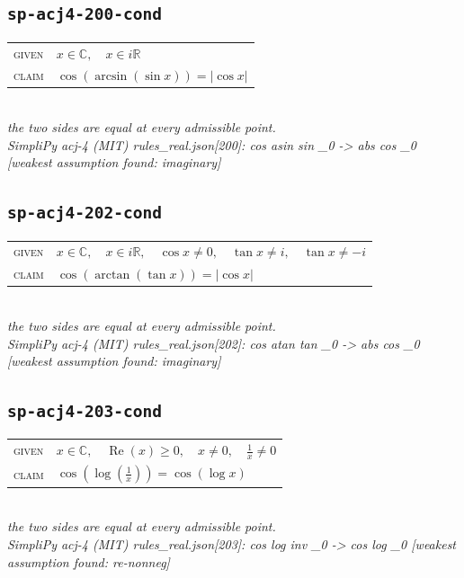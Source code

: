 \documentclass[11pt]{article}
\begin{document}
\subsection*{\texttt{sp-acj4-200-cond}}
\begin{tabular}{@{}l@{\quad}l@{}}
\textsc{given} & $x \in \mathbb{C},\quad x \in i\mathbb{R}$ \\[4pt]
\textsc{claim} & $\displaystyle \cos\left(\arcsin\left(\sin x\right)\right) = \left|\cos x\right|$ \\
\end{tabular}\\[2pt]
{\small\emph{the two sides are equal at every admissible point.}}\\
\emph{SimpliPy acj-4 (MIT) rules\_real.json[200]: cos asin sin \_0  ->  abs cos \_0  [weakest assumption found: imaginary]}\\

\subsection*{\texttt{sp-acj4-202-cond}}
\begin{tabular}{@{}l@{\quad}l@{}}
\textsc{given} & $x \in \mathbb{C},\quad x \in i\mathbb{R},\quad \cos x \neq 0,\quad \tan x \neq i,\quad \tan x \neq -i$ \\[4pt]
\textsc{claim} & $\displaystyle \cos\left(\arctan\left(\tan x\right)\right) = \left|\cos x\right|$ \\
\end{tabular}\\[2pt]
{\small\emph{the two sides are equal at every admissible point.}}\\
\emph{SimpliPy acj-4 (MIT) rules\_real.json[202]: cos atan tan \_0  ->  abs cos \_0  [weakest assumption found: imaginary]}\\

\subsection*{\texttt{sp-acj4-203-cond}}
\begin{tabular}{@{}l@{\quad}l@{}}
\textsc{given} & $x \in \mathbb{C},\quad \operatorname{Re}\left(x\right) \ge 0,\quad x \neq 0,\quad \frac{1}{x} \neq 0$ \\[4pt]
\textsc{claim} & $\displaystyle \cos\left(\log\left(\frac{1}{x}\right)\right) = \cos\left(\log x\right)$ \\
\end{tabular}\\[2pt]
{\small\emph{the two sides are equal at every admissible point.}}\\
\emph{SimpliPy acj-4 (MIT) rules\_real.json[203]: cos log inv \_0  ->  cos log \_0  [weakest assumption found: re-nonneg]}\\
\end{document}
